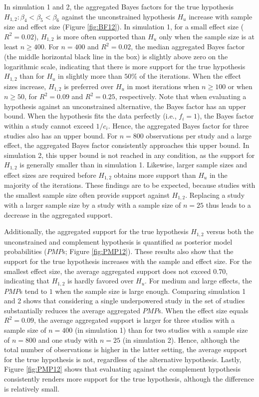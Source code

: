 \documentclass[review, 3p, authoryear]{elsarticle} %
\begin{document}
In simulation 1 and 2, the aggregated Bayes factors for the true hypothesis \(H_{1,2}: \beta_4 < \beta_5 < \beta_6\) against the unconstrained hypothesis \(H_u\) increase with sample size and effect size (Figure \ref{fig:BF12}).
In simulation 1, for a small effect size (\(R^2 = 0.02\)), \(H_{1,2}\) is more often supported than \(H_u\) only when the sample size is at least \(n \geq 400\).
For \(n = 400\) and \(R^2 = 0.02\), the median aggregated Bayes factor (the middle horizontal black line in the box) is slightly above zero on the logarithmic scale, indicating that there is more support for the true hypothesis \(H_{1,2}\) than for \(H_u\) in slightly more than \(50\%\) of the iterations.
When the effect sizes increase, \(H_{1,2}\) is preferred over \(H_u\) in most iterations when \(n \geq 100\) or when \(n \geq 50\), for \(R^2 = 0.09\) and \(R^2 = 0.25\), respectively.
Note that when evaluating a hypothesis against an unconstrained alternative, the Bayes factor has an upper bound.
When the hypothesis fits the data perfectly (i.e., \(f_i = 1\)), the Bayes factor within a study cannot exceed \(1/c_i\).
Hence, the aggregated Bayes factor for three studies also has an upper bound.
For \(n = 800\) observations per study and a large effect, the aggregated Bayes factor consistently approaches this upper bound.
In simulation 2, this upper bound is not reached in any condition, as the support for \(H_{1,2}\) is generally smaller than in simulation 1.
Likewise, larger sample sizes and effect sizes are required before \(H_{1,2}\) obtains more support than \(H_u\) in the majority of the iterations.
These findings are to be expected, because studies with the smallest sample size often provide support against \(H_{1,2}\).
Replacing a study with a larger sample size by a study with a sample size of \(n = 25\) thus leads to a decrease in the aggregated support.

Additionally, the aggregated support for the true hypothesis \(H_{1,2}\) versus both the unconstrained and complement hypothesis is quantified as posterior model probabilities (\(PMP\)s; Figure \ref{fig:PMP12}).
These results also show that the support for the true hypothesis increases with the sample and effect size.
For the smallest effect size, the average aggregated support does not exceed \(0.70\), indicating that \(H_{1,2}\) is hardly favored over \(H_u\).
For medium and large effects, the \(PMP\)s tend to \(1\) when the sample size is large enough.
Comparing simulation 1 and 2 shows that considering a single underpowered study in the set of studies substantially reduces the average aggregated \(PMP\)s.
When the effect size equals \(R^2 = 0.09\), the average aggregated support is larger for three studies with a sample size of \(n = 400\) (in simulation 1) than for two studies with a sample size of \(n = 800\) and one study with \(n = 25\) (in simulation 2).
Hence, although the total number of observations is higher in the latter setting, the average support for the true hypothesis is not, regardless of the alternative hypothesis.
Lastly, Figure \ref{fig:PMP12} shows that evaluating against the complement hypothesis consistently renders more support for the true hypothesis, although the difference is relatively small.
\end{document}
